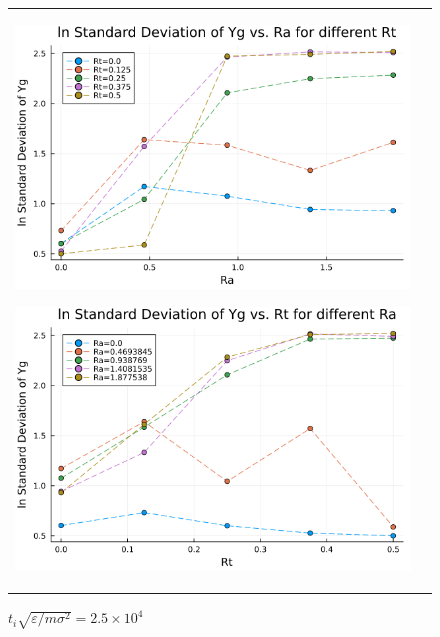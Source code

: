\begin{figure}[H]
  \begin{tabular}{cc}
    \begin{minipage}[t]{0.5\hsize}
      \centering
      \includegraphics[width=\textwidth]{image/lnStdYg_Ra0.0to1.877538_Rt0.0to0.5_ti25000.png}
      \subcaption{}
      \label{}
    \end{minipage}
    \begin{minipage}[t]{0.5\hsize}
      \centering
      \includegraphics[width=\textwidth]{image/lnStdYg_Rt0.0to0.5_Ra0.0to1.877538_ti25000.png}
      \subcaption{}
      \label{}
    \end{minipage}
  \end{tabular}
  \caption{$t_i \sqrt{\varepsilon / m \sigma^2} = 2.5 \times 10^{4}$}
  \label{}
\end{figure}


